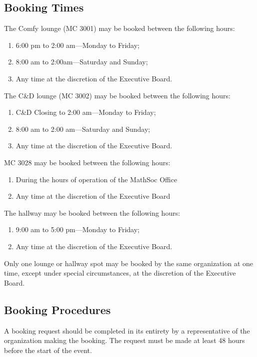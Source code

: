 \subsection{Booking Times}

\noindent The Comfy lounge (MC 3001) may be booked between the following hours:
\begin{enumerate}
  \item 6:00 pm to 2:00 am---Monday to Friday;
  \item 8:00 am to 2:00am---Saturday and Sunday;
  \item Any time at the discretion of the Executive Board.
\end{enumerate}

\noindent The C\&D lounge (MC 3002) may be booked between the following hours:
\begin{enumerate}
  \item C\&D Closing to 2:00 am---Monday to Friday;
  \item 8:00 am to 2:00 am---Saturday and Sunday;
  \item Any time at the discretion of the Executive Board.
\end{enumerate}

\noindent MC 3028 may be booked between the following hours:
\begin{enumerate}
  \item During the hours of operation of the MathSoc Office
  \item Any time at the discretion of the Executive Board
\end{enumerate}

\noindent The hallway may be booked between the following hours:
\begin{enumerate}
  \item 9:00 am to 5:00 pm---Monday to Friday;
  \item Any time at the discretion of the Executive Board.
\end{enumerate}

\noindent Only one lounge or hallway spot may be booked by the same organization at one
time, except under special circumstances, at the discretion of the Executive
Board.

\subsection{Booking Procedures}

A booking request should be completed in its entirety by a representative of
the organization making the booking. The request must be made at least 48 hours
before the start of the event.

